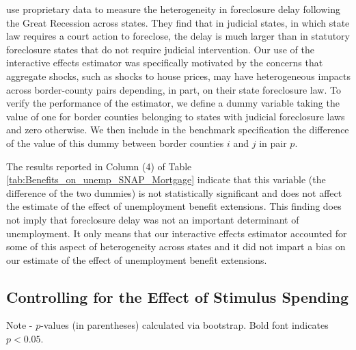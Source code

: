 \documentclass[12pt]{article}
\newcommand{\1}{\mathbf{1}}
\begin{document}
\begin{appendix}
\citet{cordell_etal:13} use proprietary data to measure the heterogeneity in foreclosure delay following the Great Recession across states. They find that in judicial states, in which state law requires a court action to foreclose, the delay is much larger than in statutory foreclosure states that do not require judicial intervention. Our use of the interactive effects estimator was specifically motivated by the concerns that aggregate shocks, such as shocks to house prices, may have heterogeneous impacts across border-county pairs depending, in part, on their state foreclosure law.  To verify the performance of the estimator, we define a dummy variable taking the value of one for border counties belonging to states with judicial foreclosure laws and zero otherwise. We then include in the benchmark specification the difference of the value of this dummy between border counties $i$ and $j$ in pair $p$.

The results reported in Column (4) of Table \ref{tab:Benefits_on_unemp_SNAP_Mortgage} indicate that this variable (the difference of the two dummies) is not statistically significant and does not affect the estimate of the effect of unemployment benefit extensions. This finding does not imply that foreclosure delay was not an important determinant of unemployment. It only means that our interactive effects estimator accounted for some of this aspect of heterogeneity across states and it did not impart a bias on our estimate of the effect of unemployment benefit extensions.



\subsection{Controlling for the Effect of Stimulus Spending}


\begin{table}[t]
\centering
   \caption{Controlling for State Tax and Spending Policies}\label{tab:Benefits_on_unemp_stimulus_taxes}
   \footnotesize

\parbox{16.5cm}{\noindent Note - $p$-values (in parentheses) calculated via bootstrap. Bold font indicates $p<0.05$.}
\vspace{-0.2cm}
\end{table}



\end{appendix}
\end{document}
